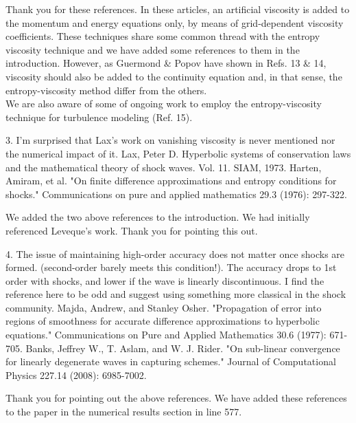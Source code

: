 \documentclass{article}
\begin{document}
Thank you for these references. In these articles, an artificial viscosity is added to the momentum
and energy equations only, by means of grid-dependent viscosity coefficients. These techniques share some common thread with
the entropy viscosity technique and we have added some references to them in the introduction. %
However, as Guermond \& Popov have shown in Refs. 13 \& 14, viscosity should also be added to the continuity equation and, 
in that sense, the entropy-viscosity method differ from the others.\\
We are also aware of some of ongoing work to employ the entropy-viscosity technique for turbulence modeling (Ref. 15).
\bigskip


{
\color{blue}
3. I'm surprised that Lax's work on vanishing viscosity is never mentioned
nor the numerical impact of it.
Lax, Peter D. Hyperbolic systems of conservation laws and the
mathematical theory of shock waves. Vol. 11. SIAM, 1973.
Harten, Amiram, et al. "On finite difference approximations and entropy
conditions for shocks." Communications on pure and applied mathematics
29.3 (1976): 297-322. 
}

We added the two above references to the introduction. %
We had initially referenced Leveque's work. Thank you for pointing this out.
\bigskip


{
\color{blue}
4. The issue of maintaining high-order accuracy does not matter once
shocks are formed. (second-order barely meets this condition!). The
accuracy drops to 1st order with shocks, and lower if the wave is linearly
discontinuous. I find the reference here to be odd and suggest using
something more classical in the shock community.
Majda, Andrew, and Stanley Osher. "Propagation of error into regions of
smoothness for accurate difference approximations to hyperbolic
equations." Communications on Pure and Applied Mathematics 30.6
(1977): 671-705.
Banks, Jeffrey W., T. Aslam, and W. J. Rider. "On sub-linear convergence
for linearly degenerate waves in capturing schemes." Journal of
Computational Physics 227.14 (2008): 6985-7002.
}

Thank you for pointing out the above references. We have added these references to the paper in the numerical results section in line 577.
\bigskip
\end{document}
